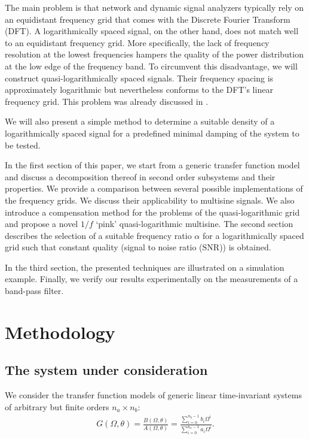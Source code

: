   The main problem is that network and dynamic signal analyzers typically
  rely on an equidistant frequency grid that comes with the Discrete Fourier Transform (DFT).
  A logarithmically spaced signal, on the other hand, does not match well to an equidistant frequency grid.
  More specifically, the lack of frequency resolution at the lowest frequencies hampers the quality of the power distribution at the low edge of the frequency band.
  To circumvent this disadvantage, we will construct quasi-logarithmically spaced signals.
  Their frequency spacing is approximately logarithmic but nevertheless conforms to the DFT's linear frequency grid.
  This problem was already discussed in \citet{Geerardyn2012IMTC}.

  We will also present a simple method to determine a suitable density of a logarithmically spaced signal for a predefined minimal damping of the system to be tested.

  In the first section of this paper, we start from a generic transfer function model and discuss a decomposition thereof in second order subsystems and their properties.
  We provide a comparison between several possible implementations of the frequency grids.
  We discuss their applicability to multisine signals.
  We also introduce a compensation method for the problems of the quasi-logarithmic grid and propose a novel $1/f$ `pink' quasi-logarithmic multisine.
  The second section describes the selection of a suitable frequency ratio $\alpha$ for a logarithmically spaced grid such that constant quality (signal to noise ratio (SNR)) is obtained.

  In the third section, the presented techniques are illustrated on a simulation example.
  Finally, we verify our results experimentally on the measurements of a band-pass filter.

\section{Methodology} \label{sec:method}

  \subsection{The system under consideration}
  We consider the transfer function models of generic linear time-invariant systems of arbitrary but finite orders $n_a\times n_b$:
  \begin{align}
    G\left( \Omega, \theta \right) = \frac{B\left( \Omega,\theta \right)}
                                          {A\left( \Omega,\theta \right)}
                                   = \frac{\sum\limits_{i=0}^{n_b-1} b_i \Omega^i}
                                          {\sum\limits_{i=0}^{n_a-1} a_i \Omega^i}
    \text{.} \label{eq:model}
  \end{align}
  
